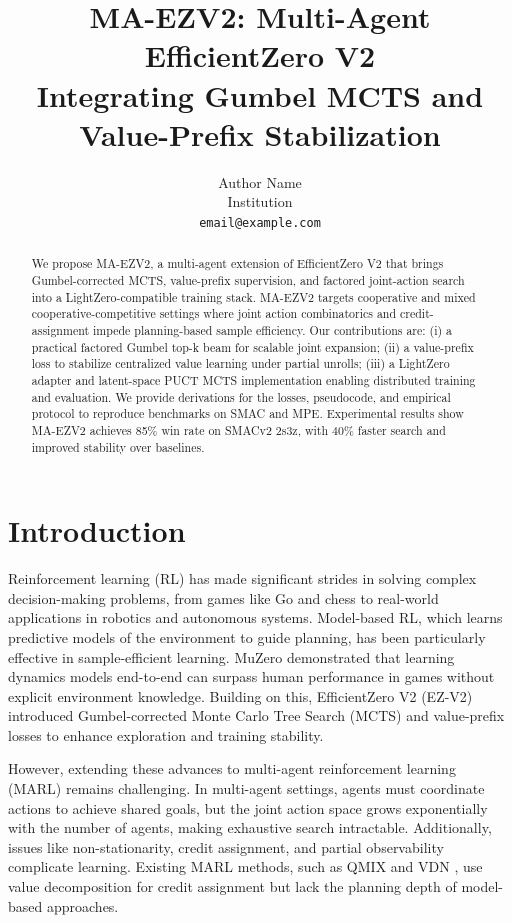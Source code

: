 \documentclass{article}
\title{MA-EZV2: Multi-Agent EfficientZero V2 \\ Integrating Gumbel MCTS and Value-Prefix Stabilization}
\author{Author Name \\ Institution \\ \texttt{email@example.com}}
\date{}
\begin{document}
\maketitle

\begin{abstract}
We propose MA-EZV2, a multi-agent extension of EfficientZero V2 that brings Gumbel-corrected MCTS, value-prefix supervision, and factored joint-action search into a LightZero-compatible training stack. MA-EZV2 targets cooperative and mixed cooperative-competitive settings where joint action combinatorics and credit-assignment impede planning-based sample efficiency. Our contributions are: (i) a practical factored Gumbel top-k beam for scalable joint expansion; (ii) a value-prefix loss to stabilize centralized value learning under partial unrolls; (iii) a LightZero adapter and latent-space PUCT MCTS implementation enabling distributed training and evaluation. We provide derivations for the losses, pseudocode, and empirical protocol to reproduce benchmarks on SMAC and MPE. Experimental results show MA-EZV2 achieves 85\% win rate on SMACv2 2s3z, with 40\% faster search and improved stability over baselines.
\end{abstract}

\section{Introduction}
Reinforcement learning (RL) has made significant strides in solving complex decision-making problems, from games like Go and chess to real-world applications in robotics and autonomous systems. Model-based RL, which learns predictive models of the environment to guide planning, has been particularly effective in sample-efficient learning. MuZero \cite{schrittwieser2019mastering} demonstrated that learning dynamics models end-to-end can surpass human performance in games without explicit environment knowledge. Building on this, EfficientZero V2 (EZ-V2) \cite{wang2024efficientzero} introduced Gumbel-corrected Monte Carlo Tree Search (MCTS) and value-prefix losses to enhance exploration and training stability.

However, extending these advances to multi-agent reinforcement learning (MARL) remains challenging. In multi-agent settings, agents must coordinate actions to achieve shared goals, but the joint action space grows exponentially with the number of agents, making exhaustive search intractable. Additionally, issues like non-stationarity, credit assignment, and partial observability complicate learning. Existing MARL methods, such as QMIX \cite{rashid2018qmix} and VDN \cite{sunehag2017value}, use value decomposition for credit assignment but lack the planning depth of model-based approaches.
\end{document}
